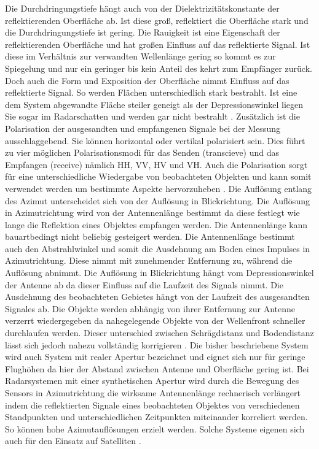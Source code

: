 Die Durchdringungstiefe hängt auch von der Dielektrizitätskonstante der reflektierenden Oberfläche ab. Ist diese groß, reflektiert die Oberfläche stark und die 
Durchdringungstiefe ist gering. Die Rauigkeit ist eine Eigenschaft der reflektierenden Oberfläche und hat großen Einfluss auf das reflektierte Signal. Ist diese im Verhältnis
zur verwandten Wellenlänge gering so kommt es zur Spiegelung und nur ein geringer bis kein Anteil des kehrt zum Empfänger zurück. Doch auch die Form und Exposition der Oberfläche 
nimmt Einfluss auf das reflektierte Signal. So werden Flächen unterschiedlich stark bestrahlt. Ist eine dem System abgewandte Fläche steiler geneigt als der Depressionswinkel 
liegen Sie sogar im Radarschatten und werden gar nicht bestrahlt \cite{einfuehrung_in_fernerkundung}. 
Zusätzlich ist die Polarisation der ausgesandten und empfangenen Signale bei der Messung ausschlaggebend. Sie können horizontal oder 
vertikal polarisiert sein. Dies führt zu vier möglichen Polarisationsmodi für das Senden (transcieve) und das Empfangen (receive) nämlich HH, VV, HV und VH. Auch die 
Polarisation sorgt für eine unterschiedliche Wiedergabe von beobachteten Objekten und kann somit verwendet werden um bestimmte Aspekte hervorzuheben
 \cite{einfuehrung_in_fernerkundung}. Die Auflösung entlang des Azimut unterscheidet sich von der Auflösung in Blickrichtung. Die Auflösung in Azimutrichtung wird von 
 der Antennenlänge bestimmt da diese festlegt wie lange die Reflektion eines Objektes empfangen werden. Die Antennenlänge kann bauartbedingt nicht beliebig gesteigert werden.
Die Antennenlänge bestimmt auch den Abstrahlwinkel und somit die Ausdehnung am Boden eines Impulses in Azimutrichtung. Diese nimmt mit zunehmender Entfernung
zu, während die Auflösung abnimmt.
Die Auflösung in Blickrichtung hängt vom Depressionswinkel der Antenne ab da dieser Einfluss auf die Laufzeit des Signals nimmt. Die Ausdehnung des beobachteten Gebietes 
hängt von der Laufzeit des ausgesandten Signales ab. Die Objekte werden abhängig von ihrer Entfernung zur Antenne verzerrt wiedergegeben da nahegelegende Objekte von der
Wellenfront schneller durchlaufen werden. Dieser unterschied zwischen Schrägdistanz und Bodendistanz lässt sich jedoch nahezu vollständig korrigieren 
\cite{einfuehrung_in_fernerkundung}. Die bisher beschriebene System wird auch System mit realer Apertur bezeichnet und eignet sich nur für geringe Flughöhen da hier 
der Abstand zwischen Antenne und Oberfläche gering ist. Bei Radarsystemen mit einer synthetischen Apertur wird durch die Bewegung des Sensors in Azimutrichtung die 
wirksame Antennenlänge rechnerisch verlängert indem die reflektierten Signale eines beobachteten Objektes von verschiedenen Standpunkten und unterschiedlichen Zeitpunkten 
miteinander korreliert werden. So können hohe Azimutauflösungen erzielt werden. Solche Systeme eigenen sich auch für den Einsatz auf Satelliten \cite{einfuehrung_in_fernerkundung}. 

